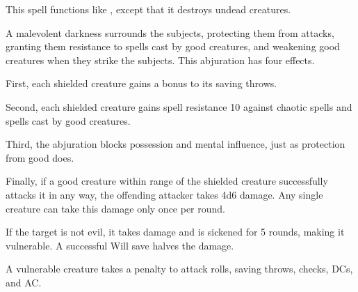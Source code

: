 \begin{comment}
\subsubsection{U-Z}
\end{comment}

\begin{spelleffect}
  This spell functions like , except that it destroys undead creatures.
\end{spelleffect}

\begin{spelleffect}
  A malevolent darkness surrounds the subjects, protecting them from attacks, granting them resistance to spells cast by good creatures, and weakening good creatures when they strike the subjects. This abjuration has four effects.
  \par First, each shielded creature gains a  bonus to its saving throws.
  \par Second, each shielded creature gains spell resistance 10 against chaotic spells and spells cast by good creatures.
  \par Third, the abjuration blocks possession and mental influence, just as protection from good does.
  \par Finally, if a good creature within \rngmed range of the shielded creature successfully attacks it in any way, the offending attacker takes 4d6 damage. Any single creature can take this damage only once per round.
\end{spelleffect}

\spellrng{\rngmed}
\begin{spelleffect}
  If the target is not evil, it takes damage and is sickened for 5 rounds, making it vulnerable. A successful Will save halves the damage.
\end{spelleffect}
\begin{spellnotes}
  A vulnerable creature takes a  penalty to attack rolls, saving throws, checks, DCs, and AC.
\end{spellnotes}

